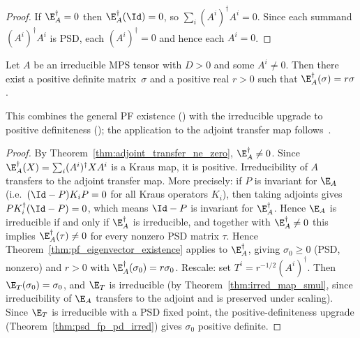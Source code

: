 \begin{proof}\leanok
    If $\E_A^\dagger = 0$ then $\E_A^\dagger(\Id) = 0$,
    so $\sum_i (A^i)^\dagger A^i = 0$.
    Since each summand $(A^i)^\dagger A^i$ is PSD,
    each $(A^i)^\dagger = 0$ and hence each $A^i = 0$.
\end{proof}

\begin{theorem}%
    \label{thm:posDef_adjoint_eigenvector}
    \leanok
    Let $A$ be an irreducible MPS tensor with $D > 0$
    and some $A^i \neq 0$.
    Then there exist a positive definite matrix~$\sigma$
    and a positive real $r > 0$ such that
    $\E_A^\dagger(\sigma) = r \sigma$.

    This combines the general PF existence
    (\cite[Theorem~6.5]{Wolf2012Quantum}) with the
    irreducible upgrade to positive definiteness
    (\cite[Theorem~6.3(2)]{Wolf2012Quantum});
    the application to the adjoint transfer map follows~\cite[Appendix~A]{Cirac2016MPDO_arXiv}.
\end{theorem}

\begin{proof}\leanok
    By Theorem~\ref{thm:adjoint_transfer_ne_zero},
    $\E_A^\dagger \neq 0$.
    Since $\E_A^\dagger(X) = \sum_i (A^i)^\dagger X A^i$ is a
    Kraus map, it is positive. Irreducibility of $A$ transfers to the
    adjoint transfer map. More precisely: if $P$ is invariant for
    $\E_A$ (i.e.\ $(\Id - P)K_i P = 0$ for all Kraus operators $K_i$),
    then taking adjoints gives $P K_i^\dagger (\Id - P) = 0$, which
    means $\Id - P$ is invariant for $\E_A^\dagger$. Hence $\E_A$
    is irreducible if and only if $\E_A^\dagger$ is irreducible, and
    together with $\E_A^\dagger \neq 0$ this implies
    $\E_A^\dagger(\tau) \neq 0$ for every nonzero PSD matrix $\tau$.
    Hence Theorem~\ref{thm:pf_eigenvector_existence} applies to
    $\E_A^\dagger$, giving $\sigma_0 \ge 0$ (PSD, nonzero)
    and $r > 0$ with $\E_A^\dagger(\sigma_0) = r \sigma_0$.
    Rescale: set $T^i = r^{-1/2} (A^i)^\dagger$.
    Then $\E_T(\sigma_0) = \sigma_0$,
    and $\E_T$ is irreducible
    (by Theorem~\ref{thm:irred_map_smul},
    since irreducibility of $\E_A$ transfers to the
    adjoint and is preserved under scaling).
    Since $\E_T$ is irreducible with a PSD fixed point,
    the positive-definiteness upgrade
    (Theorem~\ref{thm:psd_fp_pd_irred})
    gives $\sigma_0$ positive definite.
\end{proof}

